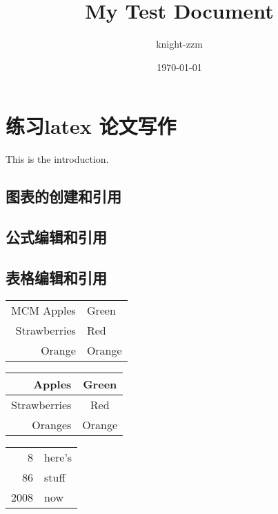 \documentclass[a4paper,12pt]{article}
\begin{document}
\title{\huge My Test Document}
\author{{\large knight-zzm}}
\date{\today}
\maketitle
\thispagestyle{empty} %
\newpage

\tableofcontents
\thispagestyle{empty} %
\newpage
{}
\section{练习latex 论文写作}
This is the introduction.

\subsection{图表的创建和引用}
\subsection{公式编辑和引用}

\subsection{表格编辑和引用}
\begin{tabular}{|r|l|}
    \hline
    MCM 
    Apples & Green \\
    Strawberries & Red \\
    Orange & Orange\\
    \hline
    \end{tabular}
    
    \begin{tabular}{rc}
    Apples & Green\\
    \hline 
    Strawberries & Red \\
    \cline{1-1}
    Oranges & Orange \\
    \end{tabular}
    
    \begin{tabular}{|r|l|}
    \hline
    8 & here's \\
    \cline{2-2}
    86 & stuff\\
    \hline \hline 
    2008 & now \\
    \hline 
    \end{tabular}
\end{document}
